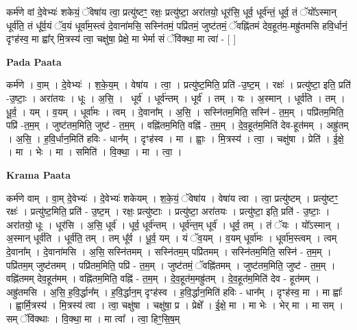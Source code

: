 \documentclass[17pt]{extarticle}
\begin{document}
कर्म॑णे वां दे॒वेभ्यः॑ शकेयं॒ ॅवेषा॑य त्वा॒ प्रत्यु॑ष्टꣳ॒॒ रक्षः॒ प्रत्यु॑ष्टा॒ अरा॑तयो॒ धूर॑सि॒ धूर्व॒ धूर्व॑न्तं॒ धूर्व॒ तं ॅयो᳚ऽस्मान् धूर्व॑ति॒ तं धू᳚र्व॒यं ॅव॒यं धूर्वा॑म॒स्त्वं दे॒वाना॑मसि॒ सस्नि॑तमं॒ पप्रि॑तमं॒ जुष्ट॑तमं॒ ॅवह्नि॑तमं देव॒हूत॑म॒-मह्रु॑तमसि हवि॒र्धानं॒ दृꣳह॑स्व॒ मा ह्वा᳚र् मि॒त्रस्य॑ त्वा॒ चक्षु॑षा॒ प्रेक्षे॒ मा भेर्मा सं ॅवि॑क्था॒ मा त्वा॑ - [ ] \newline

\textbf{Pada Paata} \newline

कर्म॑णे । वा॒म् । दे॒वेभ्यः॑ । श॒के॒य॒म् । वेषा॑य । त्वा॒ । प्रत्यु॑ष्ट॒मिति॒ प्रति॑ -उ॒ष्ट॒म् । रक्षः॑ । प्रत्यु॑ष्टा॒ इति॒ प्रति॑ -उ॒ष्टाः॒ । अरा॑तयः । धूः । अ॒सि॒ ।  धूर्व॑ । धूर्व॑न्तम् । धूर्व॑ । तम् । यः । अ॒स्मान् । धूर्व॑ति । तम् । धू॒र्व॒ । यम् । व॒यम् । धूर्वा॑मः । त्वम् । दे॒वाना᳚म् । अ॒सि॒ । सस्नि॑तम॒मिति॒ सस्नि॑ - त॒म॒म् । पप्रि॑तम॒मिति॒ पप्रि॑ -त॒म॒म् । जुष्ट॑तम॒मिति॒ जुष्ट॑ - त॒म॒म् । वह्नि॑तम॒मिति॒ वह्नि॑ - त॒म॒म् । दे॒व॒हूत॑म॒मिति॑ देव-हूत॑मम् । अह्रु॑तम् । अ॒सि॒ । ह॒वि॒र्धान॒मिति॑ हविः - धान᳚म् । दृꣳह॑स्व । मा । ह्वाः॒ । मि॒त्रस्य॑ । त्वा॒ । चक्षु॑षा । प्रेति॑ । ई॒क्षे॒ । मा । भेः । मा । समिति॑ । वि॒क्था॒ । मा । त्वा॒ ।  \newline


\textbf{Krama Paata} \newline

कर्म॑णे वाम् । वा॒म् दे॒वेभ्यः॑ । दे॒वेभ्यः॑ शकेयम् । श॒के॒यं॒ ॅवेषा॑य । वेषा॑य त्वा । त्वा॒ प्रत्यु॑ष्टम् । प्रत्यु॑ष्टꣳ॒॒ रक्षः॑ । प्रत्यु॑ष्ट॒मिति॒ प्रति॑ - उ॒ष्ट॒म् । रक्षः॒ प्रत्यु॑ष्टाः । प्रत्यु॑ष्टा॒ अरा॑तयः । प्रत्यु॑ष्टा॒ इति॒ प्रति॑ - उ॒ष्टाः॒ । अरा॑तयो॒ धूः । धूर॑सि । अ॒सि॒ धूर्व॑ । धूर्व॒ धूर्व॑न्तम् । धूर्व॑न्त॒म् धूर्व॑ । धूर्व॒ तम् । तं ॅयः । यो᳚ऽस्मान् । अ॒स्मान् धूर्व॑ति । धूर्व॑ति॒ तम् । तम् धू᳚र्व । धू॒र्व॒ यम् । यं ॅव॒यम् । व॒यम् धूर्वा॑मः । धूर्वा॑म॒स्त्वम् । त्वम् दे॒वाना᳚म् । दे॒वाना॑मसि । 
अ॒सि॒ सस्नि॑तमम् । सस्नि॑तम॒म् पप्रि॑तमम् । सस्नि॑तम॒मिति॒ सस्नि॑ - त॒म॒म् । पप्रि॑तम॒म् जुष्ट॑तमम् । पप्रि॑तम॒मिति॒ पप्रि॑ - त॒म॒म् । जुष्ट॑तमं॒ ॅवह्नि॑तमम् । जुष्ट॑तम॒मिति॒ जुष्ट॑ - त॒म॒म् । वह्नि॑तमम् देव॒हूत॑मम् । वह्नि॑तम॒मिति॒ वह्नि॑ - त॒म॒म् । दे॒व॒हूत॑म॒मह्रु॑तम् । दे॒व॒हूत॑म॒मिति॑ देव - हूत॑मम् । अह्रु॑तमसि । अ॒सि॒ ह॒वि॒र्द्धान᳚म् । ह॒वि॒र्द्धान॒म् दृꣳह॑स्व । ह॒वि॒र्द्धान॒मिति॑ हविः - धान᳚म् । दृꣳह॑स्व॒ मा । मा ह्वाः᳚ । ह्वा॒र्मि॒त्रस्य॑ । मि॒त्रस्य॑ त्वा । त्वा॒ चक्षु॑षा । चक्षु॑षा॒ प्र । प्रेक्षे᳚ । ई॒क्षे॒ मा । मा भेः । भेर् मा । मा सम् । सम् ॅवि॑क्थाः । वि॒क्था॒ मा । मा त्वा᳚ । त्वा॒ हिꣳ॒॒सि॒ष॒म् \newline
\end{document}
